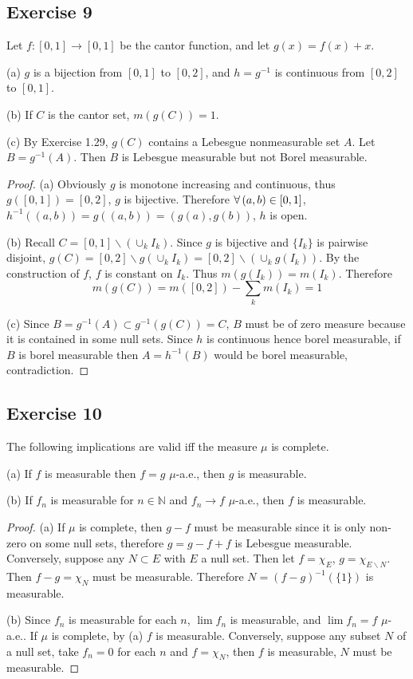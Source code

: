\subsection*{Exercise 9}
Let $f:[0,1]\to[0,1]$ be the cantor function, and let $g(x)=f(x)+x$.
\par (a) $g$ is a bijection from $[0,1]$ to $[0,2]$, and $h=g^{-1}$ is continuous from $[0,2]$ to $[0,1]$.
\par (b) If $C$ is the cantor set, $m(g(C))=1$.
\par (c) By Exercise 1.29, $g(C)$ contains a Lebesgue nonmeasurable set $A$. Let $B=g^{-1}(A)$. Then $B$ is Lebesgue measurable but not Borel measurable.
\begin{proof}
    (a) Obviously $g$ is monotone increasing and continuous, thus $g([0,1])=[0,2]$, $g$ is bijective. Therefore $\forall\, (a,b)\in[0,1]$, $h^{-1}((a,b))=g((a,b))=(g(a),g(b))$, $h$ is open.
    \par (b) Recall $C=[0,1]\backslash(\cup_kI_k)$. Since $g$ is bijective and $\{I_k\}$ is pairwise disjoint, $g(C)=[0,2]\backslash g(\cup_k I_k)=[0,2]\backslash (\cup_kg(I_k))$. By the construction of $f$, $f$ is constant on $I_k$. Thus $m(g(I_k))=m(I_k)$. Therefore
    $$
    m(g(C))=m([0,2])-\sum_k m(I_k)=1
    $$
    \par (c) Since $B=g^{-1}(A)\subset g^{-1}(g(C))=C$, $B$ must be of zero measure because it is contained in some null sets. Since $h$ is continuous hence borel measurable, if $B$ is borel measurable then $A=h^{-1}(B)$ would be borel measurable, contradiction.
\end{proof}
\subsection*{Exercise 10}
The following implications are valid iff the measure $\mu$ is complete.
\par (a) If $f$ is measurable then $f=g$ $\mu$-a.e., then $g$ is measurable.
\par (b) If $f_n$ is measurable for $n\in\mathbb{N}$ and $f_n\to f$ $\mu$-a.e., then $f$ is measurable.
\begin{proof}
    (a) If $\mu$ is complete, then $g-f$ must be measurable since it is only non-zero on some null sets, therefore $g=g-f+f$ is Lebesgue measurable. Conversely, suppose any $N\subset E$ with $E$ a null set. Then let $f=\chi_E$, $g=\chi_{E\backslash N}$. Then $f-g=\chi_N$ must be measurable. Therefore $N=(f-g)^{-1}(\{1\})$ is measurable.
    \par (b) Since $f_n$ is measurable for each $n$, $\lim f_n$ is measurable, and $\lim f_n=f$ $\mu$-a.e.. If $\mu$ is complete, by (a) $f$ is measurable. Conversely, suppose any subset $N$ of a null set, take $f_n=0$ for each $n$ and $f=\chi_N$, then $f$ is measurable, $N$ must be measurable.
\end{proof}
